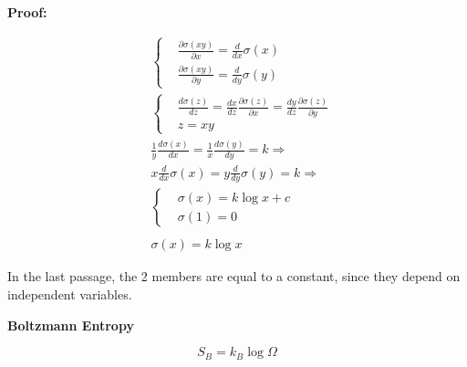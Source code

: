 \documentclass{article}
\begin{document}
\textbf{Proof:}

\begin{center}
    \begin{align*}
         & \left\{
        \begin{aligned}
             & \frac{\partial \sigma(xy)}{\partial x}=\frac{d}{dx}\sigma(x) \\
             & \frac{\partial \sigma(xy)}{\partial y}=\frac{d}{dy}\sigma(y)
        \end{aligned}
        \right.                                                                                    \\
         & \left\{
        \begin{aligned}
             & \frac{d\sigma(z)}{dz}=\frac{dx}{dz}\frac{\partial \sigma(z)}{\partial x}= \frac{dy}{dz}\frac{\partial \sigma(z)}{\partial y} \\
             & z=xy
        \end{aligned}
        \right.                                                                                    \\
         & \frac{1}{y}\frac{d \sigma (x)}{dx}=\frac{1}{x}\frac{d \sigma (y)}{dy}=k \Longrightarrow \\
         & x\frac{d}{dx}\sigma(x)=y\frac{d}{dy}\sigma(y)=k \Longrightarrow                         \\
         & \left\{
        \begin{aligned}
             & \sigma(x)=k\log{x}+c \\
             & \sigma(1)=0
        \end{aligned}
        \right.                                                                                    \\                                                                        \\
         & \sigma(x)=k\log{x}
    \end{align*}
\end{center}



In the last passage, the 2 members are equal to a constant, since they depend on independent variables.

\newpage

\begin{tcolorbox}[colframe=gray!90, colback=gray!5, coltitle=white, sharp corners, title=\textbf{Micro and Macrostates, Summary}, fonttitle=\large\bfseries]

    \textbf{Boltzmann Entropy}
    \vspace{0.5em}

    \begin{equation}
        S_B = k_B \log \Omega
    \end{equation}
\end{tcolorbox}
\end{document}
